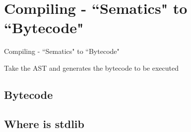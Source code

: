 \documentclass[aspectratio=169, dvipsnames, svgnames, x11names]{beamer}
\begin{document}
\section{Compiling - ``Sematics" to ``Bytecode"}
\begin{frame}{Compiling - ``Sematics" to ``Bytecode"}
\begin{itemize}
{\LARGE \item[-] Take the AST and generates the bytecode to be executed}
\end{itemize}
\end{frame}

\subsection{Bytecode}
\subsection{Where is {\ttfamily stdlib}}
\end{document}
